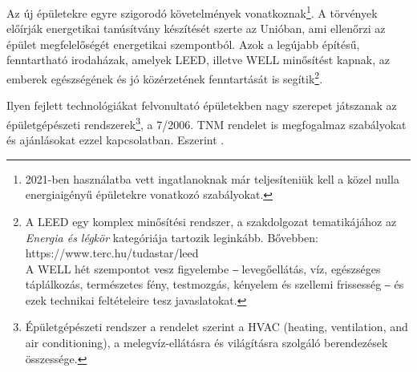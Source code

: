 Az új épületekre egyre szigorodó követelmények vonatkoznak\footnote{2021-ben használatba vett ingatlanoknak már teljesíteniük kell a közel nulla energiaigényű épületekre \cite{NZEB} vonatkozó szabályokat. }.
A törvények előírják energetikai tanúsítvány készítését szerte az Unióban, ami ellenőrzi az épület megfelelőségét energetikai szempontból.
Azok a legújabb építésű, fenntartható irodaházak, amelyek LEED, illetve WELL minősítést kapnak, az emberek egészségének és jó közérzetének fenntartását is segítik\footnote{A LEED %
egy komplex minősítési rendszer, a szakdolgozat tematikájához az \textit{Energia és légkör} kategóriája tartozik leginkább. Bővebben: https://www.terc.hu/tudastar/leed \\
A WELL hét szempontot vesz figyelembe ‒ levegőellátás, víz, egészséges táplálkozás, természetes fény, testmozgás, kényelem és szellemi frissesség ‒ és ezek technikai feltételeire tesz javaslatokat.}.

Ilyen fejlett technológiákat felvonultató épületekben nagy szerepet játszanak az épületgépészeti rendszerek\footnote{Épületgépészeti rendszer a \cite{TNM2006} rendelet szerint a  HVAC (heating, ventilation, and air conditioning), a melegvíz-ellátásra és világításra szolgáló berendezések összessége.},
a 7/2006. TNM rendelet \cite{TNM2006} is megfogalmaz szabályokat és ajánlásokat ezzel kapcsolatban. Eszerint . 





